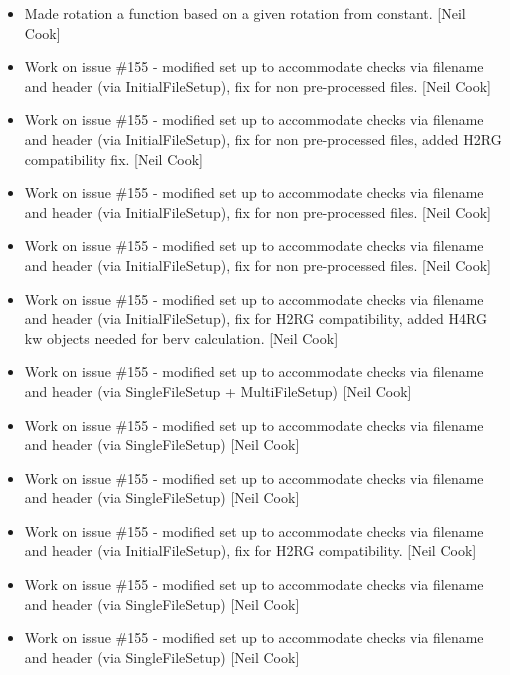 \documentclass[a4paper,10pt,english]{report}
\begin{document}
\begin{itemize}
\item {} 
Made rotation a function based on a given rotation from constant.
{[}Neil Cook{]}

\item {} 
Work on issue \#155 - modified set up to accommodate checks via
filename and header (via InitialFileSetup), fix for non pre-processed
files. {[}Neil Cook{]}

\item {} 
Work on issue \#155 - modified set up to accommodate checks via
filename and header (via InitialFileSetup), fix for non pre-processed
files, added H2RG compatibility fix. {[}Neil Cook{]}

\item {} 
Work on issue \#155 - modified set up to accommodate checks via
filename and header (via InitialFileSetup), fix for non pre-processed
files. {[}Neil Cook{]}

\item {} 
Work on issue \#155 - modified set up to accommodate checks via
filename and header (via InitialFileSetup), fix for non pre-processed
files. {[}Neil Cook{]}

\item {} 
Work on issue \#155 - modified set up to accommodate checks via
filename and header (via InitialFileSetup), fix for H2RG
compatibility, added H4RG kw objects needed for berv calculation.
{[}Neil Cook{]}

\item {} 
Work on issue \#155 - modified set up to accommodate checks via
filename and header (via SingleFileSetup + MultiFileSetup) {[}Neil Cook{]}

\item {} 
Work on issue \#155 - modified set up to accommodate checks via
filename and header (via SingleFileSetup) {[}Neil Cook{]}

\item {} 
Work on issue \#155 - modified set up to accommodate checks via
filename and header (via SingleFileSetup) {[}Neil Cook{]}

\item {} 
Work on issue \#155 - modified set up to accommodate checks via
filename and header (via InitialFileSetup), fix for H2RG
compatibility. {[}Neil Cook{]}

\item {} 
Work on issue \#155 - modified set up to accommodate checks via
filename and header (via SingleFileSetup) {[}Neil Cook{]}

\item {} 
Work on issue \#155 - modified set up to accommodate checks via
filename and header (via SingleFileSetup) {[}Neil Cook{]}

\end{itemize}
\end{document}
